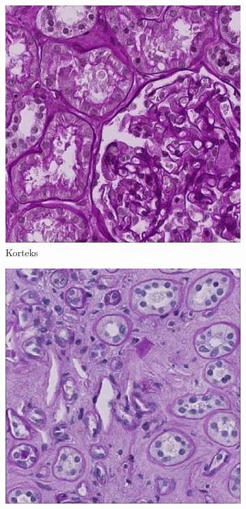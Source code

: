 \begin{figure}[h]
	\centering
	\begin{subfigure}[b]{0.3\textwidth}
		\centering
		\includegraphics[width=\textwidth]{gambar/korteks.png}
		\caption{Korteks}
		\label{fig:korteks}
	\end{subfigure}
	\hfill
	\begin{subfigure}[b]{0.3\textwidth}
		\centering
		\includegraphics[width=\textwidth]{gambar/medula.png}

\end{subfigure}
\end{figure}

